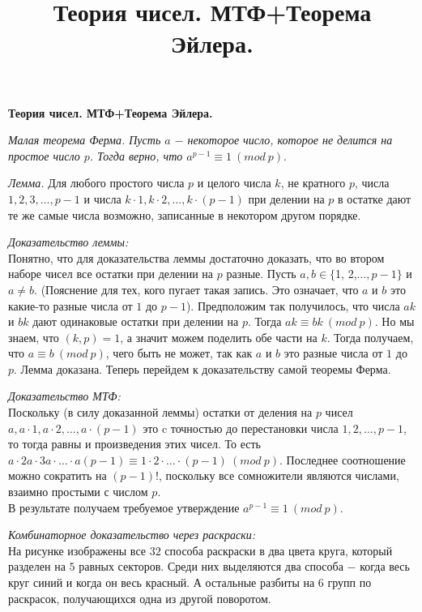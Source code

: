 \centerline{\bf \Huge Теория чисел. МТФ+Теорема Эйлера.}
\title{Теория чисел. МТФ+Теорема Эйлера.}

\textit{Малая теорема Ферма. Пусть $a$ $-$ некоторое число, которое не делится на простое число $p$. Тогда верно, что $a^{p-1} \equiv 1 \ (mod \ p)$}.

\par

\textit{Лемма.}  Для любого простого числа $p$ и целого числа $k$, не кратного $p$, числа $1, 2, 3, \dots , p-1$ и числа $k\cdot 1,  k \cdot 2, \dots ,  k \cdot (p-1)$  при делении на $p$ в остатке дают те же самые числа возможно, записанные в некотором другом порядке.

\par 

\textit{Доказательство леммы:}\\
Понятно, что для доказательства леммы достаточно доказать, что во втором наборе чисел все остатки при делении на $p$ разные. Пусть $a, b \in \{$1, 2,$ \dots , p - 1\}$ и $a \neq b$. (Пояснение для тех, кого пугает такая запись. Это означает, что $a$ и $b$ это какие-то разные числа от $1$ до $p-1$). Предположим так получилось, что числа $ak$ и $bk$ дают одинаковые остатки при делении на $p$. Тогда $ak \equiv bk \ (mod \ p)$. Но мы знаем, что $(k, p) = 1$, а значит можем поделить обе части на $k$. Тогда получаем, что $a \equiv b \ (mod \ p)$, чего быть не может, так как $a$ и $b$ это разные числа от $1$ до $p$. Лемма доказана. Теперь перейдем к доказательству самой теоремы Ферма.

\par 

\textit{Доказательство МТФ:}\\
Поскольку (в силу доказанной леммы) остатки от деления на $p$ чисел $a, a\cdot1, a\cdot2, \dots, a\cdot(p-1)$ это c точностью до перестановки числа $1, 2, \dots, p-1$, то тогда равны и произведения этих чисел. То есть  $a\cdot 2a \cdot 3a \cdot \ldots \cdot a(p-1) \equiv 1 \cdot 2 \cdot \ldots \cdot (p-1) \ (mod \ p)$. Последнее соотношение можно сократить на $(p - 1)!$, поскольку все сомножители являются числами, взаимно простыми с числом $p$.\\
В результате получаем требуемое утверждение $a^{p-1} \equiv 1 \ (mod \ p).$

\par

\textit{Комбинаторное доказательство через раскраски:}\\
На рисунке изображены все $32$ способа раскраски в два цвета круга, который разделен на $5$ равных секторов. Среди них выделяются два способа $-$ когда весь круг синий и когда он весь красный. А остальные разбиты на $6$ групп по  раскрасок, получающихся одна из другой поворотом.


